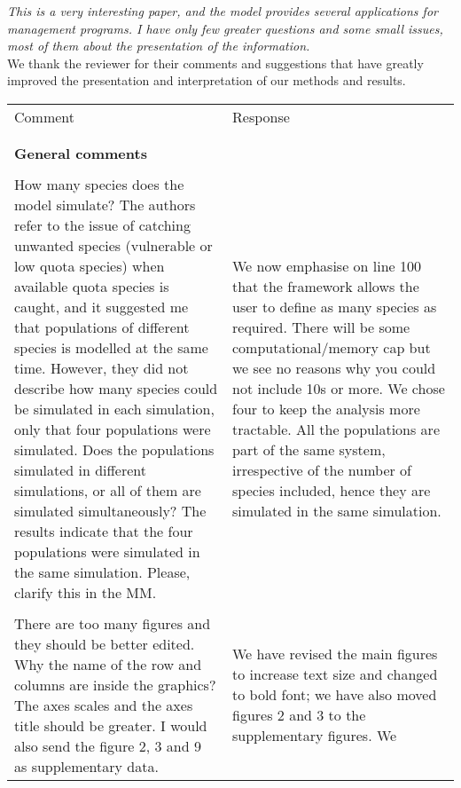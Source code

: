 \documentclass[10pt]{letter}
\begin{document}
\textit{This is a very interesting paper, and the model provides several
	applications for management programs. I have only few greater questions
	and some small issues, most of them about the presentation of the
	information.}  \\

We thank the reviewer for their comments and suggestions that have greatly
improved the presentation and interpretation of our methods and results.

\begin{center}


	\begin{longtable}{p{8cm} | p{8cm}}
		\toprule
		Comment & Response \\
\\
\hline
\\	
	\textbf{General comments} &  \\
\\
		 How many species does the model simulate? The authors refer to
		 the issue of catching unwanted species (vulnerable or low
		 quota species) when available quota species is caught, and it
		 suggested me that populations of different species is modelled
		 at the same time. However, they  did not describe how many
		 species could be simulated in each simulation, only that four
		 populations were simulated. Does the populations simulated in
		 different simulations, or all of them are simulated
		 simultaneously? The results indicate that the four populations
		 were simulated in the same simulation. Please, clarify this in
		 the MM.  & We now emphasise on line 100 that the framework
		 allows the user to define as many species as required. There
		 will be some computational/memory cap but we see no reasons
		 why you could not include 10s or more. We chose four to keep
		 the analysis more tractable. All the populations are part of
		 the same system, irrespective of the number of species
		 included, hence they are simulated in the same simulation.\\
\\
There are too many figures and they should be better edited. Why the name of
the row and columns are inside the graphics? The axes scales and the axes title
should be greater. I would also send the figure 2, 3 and 9 as supplementary
data.  & We have revised the main figures to increase text size and changed to
bold font; we have also moved figures 2 and 3 to the supplementary figures. We

\end{longtable}
\end{center}
\end{document}
